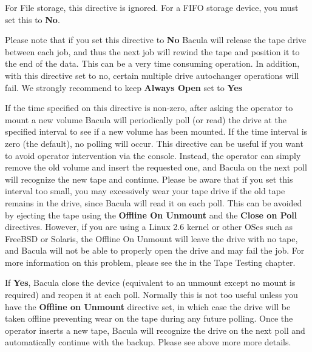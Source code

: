 \begin{description}
   For File storage, this directive is ignored. For a FIFO storage  device, you
   must set this to {\bf No}.  
   
   Please note that if you set this directive to {\bf No} Bacula  will release
   the tape drive between each job, and thus the next job  will rewind the tape
   and position it to the end of the data. This  can be a very time consuming
   operation. In addition, with this directive set to no, certain multiple
   drive autochanger operations will fail.  We strongly recommend to keep
   {\bf Always Open} set to {\bf Yes}

\item [Volume Poll Interval = {\it time}]
   If the time  specified on this directive is non-zero, after  asking the
   operator to mount a new volume Bacula will  periodically poll (or read) the
   drive at the specified  interval to see if a new volume has been mounted. If
   the  time interval is zero (the default), no polling will occur.  This
   directive can be useful if you want to avoid operator  intervention via the
   console. Instead, the operator can  simply remove the old volume and insert
   the requested one,  and Bacula on the next poll will recognize the new tape
   and  continue. Please be aware that if you set this interval  too small, you
   may excessively wear your tape drive if the  old tape remains in the drive,
   since Bacula will read it on  each poll. This can be avoided by ejecting the
   tape using  the {\bf Offline On Unmount} and the {\bf Close on Poll} 
   directives. 
   However, if you are using a Linux 2.6 kernel or other OSes
   such as FreeBSD or Solaris, the Offline On Unmount will leave the drive
   with no tape, and Bacula will not be able to properly open the drive and
   may fail the job.  For more information on this problem, please see the
    in the Tape
   Testing chapter.

\item [Close on Poll= {\it yes\vb{}no}]
   If {\bf Yes}, Bacula close the device (equivalent to  an unmount except no
   mount is required) and reopen it at each  poll. Normally this is not too
   useful unless you have the  {\bf Offline on Unmount} directive set, in which
   case the  drive will be taken offline preventing wear on the tape  during any
   future polling. Once the operator inserts a new  tape, Bacula will recognize
   the drive on the next poll and  automatically continue with the backup. 
   Please see above more more details.


\end{description}
